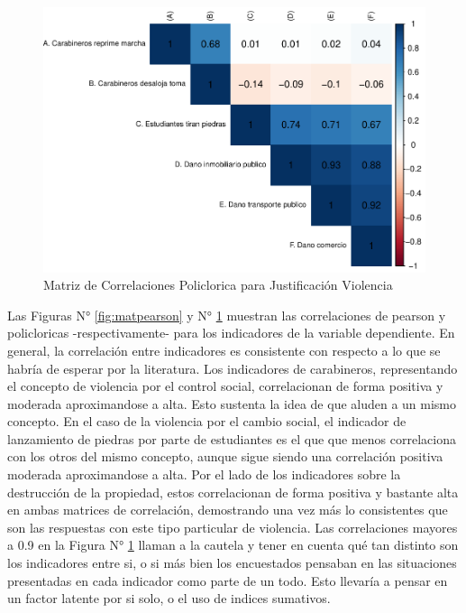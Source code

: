 \documentclass[12pt,twoside]{templates/facsothesis}
\begin{document}
\begin{figure}[!ht]

{\centering \includegraphics[width=1\linewidth,]{tesis_files/figure-latex/matpolycor-1} 

}

\caption{Matriz de Correlaciones Policlorica para Justificación Violencia}\label{fig:matpolycor}
\end{figure}

Las Figuras N° \ref{fig:matpearson} y N° \ref{fig:matpolycor} muestran las correlaciones de pearson y policloricas -respectivamente- para los indicadores de la variable dependiente. En general, la correlación entre indicadores es consistente con respecto a lo que se habría de esperar por la literatura. Los indicadores de carabineros, representando el concepto de violencia por el control social, correlacionan de forma positiva y moderada aproximandose a alta. Esto sustenta la idea de que aluden a un mismo concepto. En el caso de la violencia por el cambio social, el indicador de lanzamiento de piedras por parte de estudiantes es el que que menos correlaciona con los otros del mismo concepto, aunque sigue siendo una correlación positiva moderada aproximandose a alta. Por el lado de los indicadores sobre la destrucción de la propiedad, estos correlacionan de forma positiva y bastante alta en ambas matrices de correlación, demostrando una vez más lo consistentes que son las respuestas con este tipo particular de violencia. Las correlaciones mayores a 0.9 en la Figura N° \ref{fig:matpolycor} llaman a la cautela y tener en cuenta qué tan distinto son los indicadores entre si, o si más bien los encuestados pensaban en las situaciones presentadas en cada indicador como parte de un todo. Esto llevaría a pensar en un factor latente por si solo, o el uso de indices sumativos.
\end{document}
